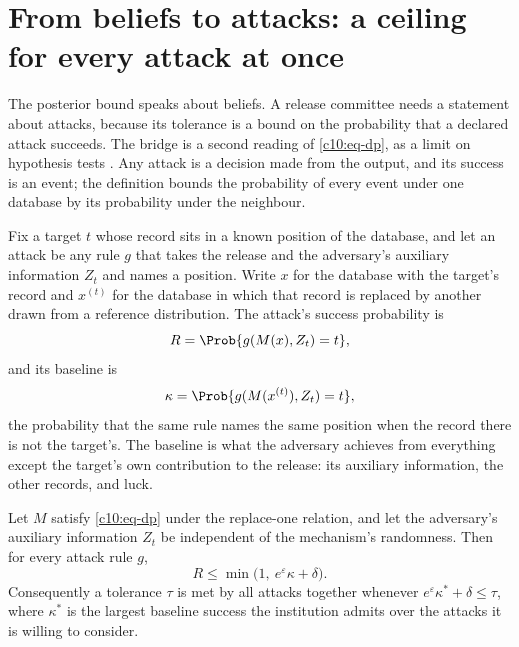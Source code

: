 \section{From beliefs to attacks: a ceiling for every attack at once}

The posterior bound speaks about beliefs. A release committee needs a statement
about attacks, because its tolerance is a bound on the probability that a declared
attack succeeds. The bridge is a second reading of \eqref{c10:eq-dp}, as a limit on
hypothesis tests \citep{wasserman2010,kairouz2017,dong2022,balle2020}. Any attack
is a decision made from the output, and its success is an event; the definition
bounds the probability of every event under one database by its probability under
the neighbour.

Fix a target $t$ whose record sits in a known position of the database, and let
an attack be any rule $g$ that takes the release and the adversary's auxiliary
information $Z_t$ and names a position. Write $x$ for the database with the
target's record and $x^{(t)}$ for the database in which that record is replaced
by another drawn from a reference distribution. The attack's success
probability is
\begin{equation}\label{c10:eq-R}
R = \Prob\{g(M(x), Z_t) = t\},
\end{equation}
and its baseline is
\begin{equation}\label{c10:eq-kappa}
\kappa = \Prob\{g(M(x^{(t)}), Z_t) = t\},
\end{equation}
the probability that the same rule names the same position when the record there
is not the target's. The baseline is what the adversary achieves from everything
except the target's own contribution to the release: its auxiliary information,
the other records, and luck.

\begin{proposition}\label{c10:prop-ceiling}
Let $M$ satisfy \eqref{c10:eq-dp} under the replace-one relation, and let the
adversary's auxiliary information $Z_t$ be independent of the mechanism's
randomness. Then for every attack rule $g$,
\begin{equation}\label{c10:eq-ceiling}
R \le \min\bigl(1,\ e^{\varepsilon}\kappa + \delta\bigr).
\end{equation}
Consequently a tolerance $\tau$ is met by all attacks together whenever
$e^{\varepsilon}\kappa^\ast + \delta \le \tau$, where $\kappa^\ast$ is the largest
baseline success the institution admits over the attacks it is willing to
consider.
\end{proposition}

